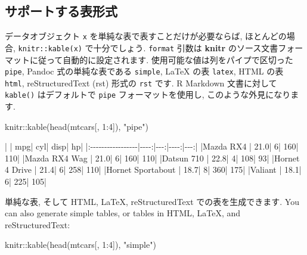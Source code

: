 \documentclass[
  11pt,
]{bxjsreport}
\newenvironment{Shaded}{\begin{snugshade}}{\end{snugshade}}
\newcommand{\DecValTok}[1]{\textcolor[rgb]{0.00,0.00,0.81}{#1}}
\newcommand{\FunctionTok}[1]{\textcolor[rgb]{0.00,0.00,0.00}{#1}}
\newcommand{\NormalTok}[1]{#1}
\newcommand{\SpecialCharTok}[1]{\textcolor[rgb]{0.00,0.00,0.00}{#1}}
\newcommand{\StringTok}[1]{\textcolor[rgb]{0.31,0.60,0.02}{#1}}
\begin{document}
\hypertarget{kable-formats}{%
\subsection{サポートする表形式}\label{kable-formats}}

データオブジェクト \texttt{x} を単純な表で表すことだけが必要ならば, ほとんどの場合, \texttt{knitr::kable(x)} で十分でしょう. \texttt{format} 引数は \textbf{knitr} のソース文書フォーマットに従って自動的に設定されます. 使用可能な値は列をパイプで区切った \texttt{pipe}, Pandoc 式の単純な表である \texttt{simple}, LaTeX の表 \texttt{latex}, HTML の表 \texttt{html}, reStructuredText (rst) 形式の \texttt{rst} です. R Markdown 文書に対して \texttt{kable()} はデフォルトで \texttt{pipe} フォーマットを使用し, このような外見になります.

\begin{Shaded}
\begin{Highlighting}[numbers=left,,]
\NormalTok{knitr}\SpecialCharTok{::}\FunctionTok{kable}\NormalTok{(}\FunctionTok{head}\NormalTok{(mtcars[, }\DecValTok{1}\SpecialCharTok{:}\DecValTok{4}\NormalTok{]), }\StringTok{"pipe"}\NormalTok{)}
\end{Highlighting}
\end{Shaded}

\begin{Shaded}
\begin{Highlighting}[]
\NormalTok{|                  |  mpg| cyl| disp|  hp|}
\NormalTok{|:{-}{-}{-}{-}{-}{-}{-}{-}{-}{-}{-}{-}{-}{-}{-}{-}{-}|{-}{-}{-}{-}:|{-}{-}{-}:|{-}{-}{-}{-}:|{-}{-}{-}:|}
\NormalTok{|Mazda RX4         | 21.0|   6|  160| 110|}
\NormalTok{|Mazda RX4 Wag     | 21.0|   6|  160| 110|}
\NormalTok{|Datsun 710        | 22.8|   4|  108|  93|}
\NormalTok{|Hornet 4 Drive    | 21.4|   6|  258| 110|}
\NormalTok{|Hornet Sportabout | 18.7|   8|  360| 175|}
\NormalTok{|Valiant           | 18.1|   6|  225| 105|}
\end{Highlighting}
\end{Shaded}

単純な表, そして HTML, LaTeX, reStructuredText での表を生成できます. You can also generate simple tables, or tables in HTML, LaTeX, and reStructuredText:

\begin{Shaded}
\begin{Highlighting}[numbers=left,,]
\NormalTok{knitr}\SpecialCharTok{::}\FunctionTok{kable}\NormalTok{(}\FunctionTok{head}\NormalTok{(mtcars[, }\DecValTok{1}\SpecialCharTok{:}\DecValTok{4}\NormalTok{]), }\StringTok{"simple"}\NormalTok{)}
\end{Highlighting}
\end{Shaded}
\end{document}
